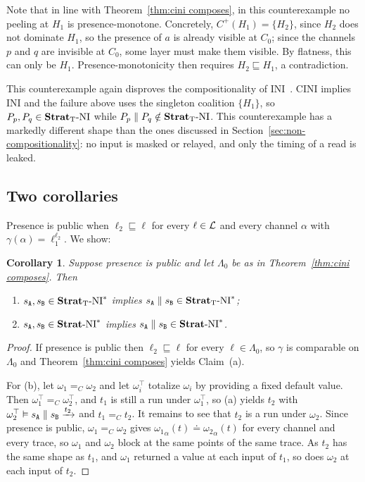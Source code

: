 \documentclass[preprint,5p,twocolumn]{elsarticle}
\newtheorem{corollary}[theorem]{Corollary}
\begin{document}
Note that in line with Theorem~\ref{thm:cini composes}, in
this counterexample no peeling
at $H_1$ is presence-monotone. Concretely, $C^+(H_1) = \lbrace H_2 \rbrace$, since $H_2$ does not
dominate $H_1$, so the presence of $a$ is already visible at $C_0$; since the channels $p$ and $q$
are invisible at $C_0$, some layer must make them visible. By flatness, this can only be $H_1$.
Presence-monotonicity then requires $H_2 \sqsubseteq H_1$, a
contradiction.

This counterexample again disproves the compositionality of INI~\cite[Theorem V.1]{Rafnsson2012}.
CINI implies INI and the failure above uses the singleton coalition $\lbrace H_1 \rbrace$,
so $P_p, P_q \in \mathbf{Strat}_{\mathrm{T}}\text{-}\mathrm{NI}$ while
$P_p \parallel P_q \notin \mathbf{Strat}_{\mathrm{T}}\text{-}\mathrm{NI}$.
This counterexample has a markedly different shape than the ones discussed in Section~\ref{sec:non-compositionality}:
no input is masked or relayed, and only the timing of a read is leaked.

\subsection{Two corollaries}

\label{sec:corollaries}

Presence is public when $\ell_2 \sqsubseteq \ell$ for every $\ell \in \mathcal{L}$ and every channel
$\alpha$ with $\gamma(\alpha) = \ell_1^{\ell_2}$. We show:

\begin{corollary}
  \label{cor:public presence}
  Suppose presence is public and let $\Lambda_0$ be as in Theorem~\ref{thm:cini composes}. Then
  \begin{enumerate}
    \item[(a)] $s_{\mathtt{A}}, s_{\mathtt{B}} \in \mathbf{Strat}_{\mathrm{T}}\text{-}\mathrm{NI}^*$ implies $s_{\mathtt{A}} \parallel s_{\mathtt{B}} \in \mathbf{Strat}_{\mathrm{T}}\text{-}\mathrm{NI}^*$;
    \item[(b)] $s_{\mathtt{A}}, s_{\mathtt{B}} \in \mathbf{Strat}\text{-}\mathrm{NI}^*$ implies $s_{\mathtt{A}} \parallel s_{\mathtt{B}} \in \mathbf{Strat}\text{-}\mathrm{NI}^*$.
  \end{enumerate}
\end{corollary}
\begin{proof}
  If presence is public then $\ell_2 \sqsubseteq \ell$ for every $\ell \in \Lambda_0$, so $\gamma$
  is comparable on $\Lambda_0$ and Theorem~\ref{thm:cini composes} yields
  Claim~(a).

  For (b), let $\omega_1 =_C \omega_2$ and let $\omega_i^\top$ totalize $\omega_i$ by providing a fixed default
  value. Then $\omega_1^\top =_C \omega_2^\top$, and $t_1$ is still a run under
  $\omega_1^\top$, so (a) yields $t_2$ with $\omega_2^\top \vDash s_{\mathtt{A}} \parallel s_{\mathtt{B}}
  \xrightarrow{t_2}$ and $t_1 =_C t_2$. It remains to see that $t_2$ is a run under $\omega_2$.
  Since presence is public, $\omega_1 =_C \omega_2$ gives ${\omega_1}_\alpha(t) \doteq
  {\omega_2}_\alpha(t)$ for every channel and every trace, so $\omega_1$ and $\omega_2$ block at the
  same points of the same trace. As $t_2$ has the same shape as $t_1$, and $\omega_1$ returned a
  value at each input of $t_1$, so does $\omega_2$ at each input of
  $t_2$.
\end{proof}
\end{document}
